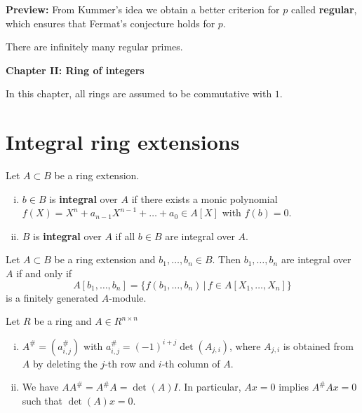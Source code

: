 \bigskip
\textbf{Preview:} From Kummer's idea we obtain a better criterion
 for $p$ called \textbf{regular}, which ensures that Fermat's conjecture holds for $p$.
 

 \begin{conjecture*}There are infinitely many regular primes.
 \end{conjecture*}




\clearpage

\textbf{Chapter II: Ring of integers}

In this chapter, all rings are assumed to be commutative with $1$.

\setcounter{section}{0}
\section{Integral ring extensions}

\begin{definition}
	Let $A\subset B$ be a ring extension.
\begin{enumerate}[(i)]
\item $b \in B$ is \textbf{integral } over $A$ if there exists a monic polynomial
$f(X)=X^n+a_{n-1}X^{n-1}+\dots + a_0 \in A[X]$ with $f(b)=0$.
\item $B$ is \textbf{integral } over $A$ if all $b\in B$ are integral over $A$.
\end{enumerate}
\end{definition}

\begin{prop}
	Let $A\subset B$ be a ring extension and $b_1,\dots,b_n \in B$. Then
	$b_1,\dots, b_n$ are integral over $A$ if and only if 
	\[ A[b_1,\dots, b_n] = \{ f(b_1,\dots,b_n) \, | \, f \in A[X_1,\dots, X_n]
	\}
	\]
	is a finitely generated $A$-module.
\end{prop}

\begin{reminder}
Let $R$ be a ring and $A \in R^{n \times n}$
\begin{enumerate}[(i)]
\item $A^\# = (a_{i,j}^\#)$ with $a_{i,j}^\# = (-1)^{i+j} \det(A_{j,i})$,
	where $A_{j,i}$ is obtained from $A$ by deleting the $j$-th row and $i$-th column of $A$.
\item We have $AA^\# = A^\#A = \det(A) I$.
In particular, $Ax=0$ implies $A^\#Ax=0$ such that $\det(A)x = 0$.
\end{enumerate}
\end{reminder}

